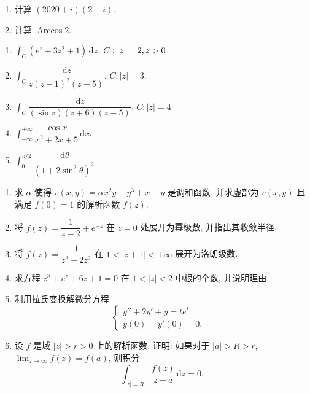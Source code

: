 \documentclass[simple]{hfutexam}
\newcommand{\diff}{\,\mathrm{d}}
\let\Re\relax
\DeclareMathOperator\Re{Re}
\DeclareMathOperator\Arccos{Arccos}
\begin{document}
\newpage

\maketitle


\begin{enumerate}
\item 计算 $(2020+i)(2-i)$.
\item 计算 $\Arccos 2$.
\end{enumerate}

\begin{enumerate}
\item $\displaystyle\int_C(e^z+3z^2+1)\diff z$, $C:|z|=2,\Re z>0$.
\item $\displaystyle\int_C\dfrac{\diff z}{z(z-1)^2(z-5)}$, $C:|z|=3$.
\item $\displaystyle\int_C\dfrac{\diff z}{(\sin z)(z+6)(z-5)}$, $C:|z|=4$.
\item $\displaystyle\int_{-\infty}^{+\infty}\dfrac{\cos x}{x^2+2x+5}\diff x$.
\item $\displaystyle\int_0^{\pi/2}\dfrac{\diff \theta}{(1+2\sin^2\theta)^2}$.
\end{enumerate}

\begin{enumerate}
\item 求 $\alpha$ 使得 $v(x,y)=\alpha x^2y-y^3+x+y$ 是调和函数, 并求虚部为 $v(x,y)$ 且满足 $f(0)=1$ 的解析函数 $f(z)$.
\item 将 $f(z)=\dfrac{1}{z-2}+e^{-z}$ 在 $z=0$ 处展开为幂级数, 并指出其收敛半径.
\item 将 $f(z)=\dfrac{1}{z^3+2z^2}$ 在 $1<|z+1|<+\infty$ 展开为洛朗级数.
\item 求方程 $z^8+e^z+6z+1=0$ 在 $1<|z|<2$ 中根的个数, 并说明理由.
\item 利用拉氏变换解微分方程 
\[\begin{cases}
y''+2y'+y=te^t&\\
y(0)=y'(0)=0.&
\end{cases}\]
\item 设 $f$ 是域 $|z|>r>0$ 上的解析函数.
证明: 如果对于 $|a|>R>r$,  $\displaystyle\lim_{z\to\infty} f(z)=f(a)$, 则积分
  \[\int_{|z|=R} \frac{f(z)}{z-a}\diff z=0.\]
\end{enumerate}
\end{document}
